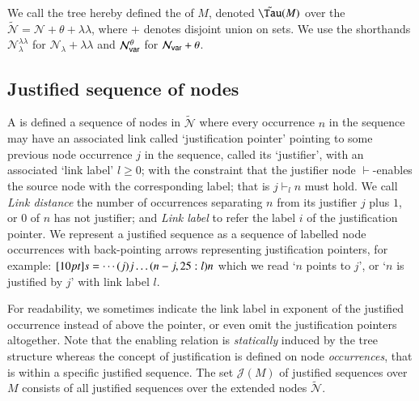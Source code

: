 \documentclass{elsarticle}
\theoremstyle{plain}
\theoremstyle{definition}
\newcommand\Nodes{\mathcal{N}}%
\newcommand\NodesVar{\Nodes_{\sf var}}%
\newcommand\NodesLmd{\Nodes_\lambda}%
\newcommand{\ghostlmd}{{\lambda\!\!\lambda}}
\newcommand{\ghostvar}{\theta}
\newcommand\ExtendedNodes{\tilde{\Nodes}}
\newcommand\ExtendedNodesVar{\NodesVar^\ghostvar}
\newcommand\ExtendedNodesLmd{\NodesLmd^\ghostlmd}
\newcommand{\enables}{\vdash} %
\newcommand{\exttree}{\tilde{\Tau}} %
\def\justseqset{\mathcal{J}}
\begin{document}
We call the tree hereby defined the  of $M$,
denoted $\exttree(M)$ over the  $\ExtendedNodes = \Nodes + \ghostvar + \ghostlmd$, where $+$ denotes disjoint union on sets. We use the shorthands $\ExtendedNodesLmd$ for $\NodesLmd + \ghostlmd$ and $\ExtendedNodesVar$ for $\NodesVar + \ghostvar$.

\subsection{Justified sequence of nodes}
\label{sec:justseq}

A  is defined a sequence of nodes in $\ExtendedNodes$ where every occurrence $n$ in the sequence may have an associated link called `justification pointer' pointing to some previous node occurrence $j$ in the sequence, called its `justifier', with an associated `link label' $l\geq0$; with the constraint that the justifier node $\enables$-enables the source node with the corresponding label; that is $j \enables_l n$ must hold. We call \emph{Link distance} the number of occurrences separating $n$ from its justifier $j$ plus $1$, or $0$ of $n$ has not justifier;
and \emph{Link label} to refer the label $i$ of the justification pointer.
We represent a justified sequence as a sequence of labelled node occurrences with back-pointing arrows representing justification pointers, for example: $\Pstr[10pt]{ s = \cdots (j){j} \ldots (n-j,25:l){n} }$ which we read `$n$ points to $j$', or `$n$ is justified by $j$' with link label $l$.

For readability, we sometimes indicate the link label in exponent of the justified occurrence instead of above the pointer, or even omit the justification pointers altogether.
Note that the enabling relation is \emph{statically} induced by the tree structure whereas the concept of justification is defined on node \emph{occurrences}, that is within a specific justified sequence. The set $\justseqset(M)$ of justified sequences over $M$ consists of all justified sequences over the extended nodes $\ExtendedNodes$.
\end{document}
